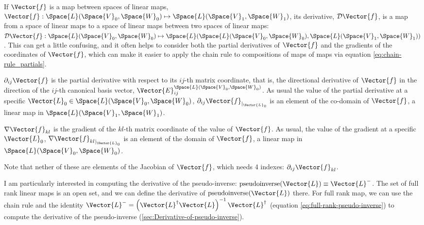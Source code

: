 If $\Vector{f}$ is a map between spaces of linear maps,
$\Vector{f} : \Space{L}(\Space{V}_0,\Space{W}_0) \mapsto \Space{L}(\Space{V}_1,\Space{W}_1)$,
its derivative, $\Da{\Vector{f}}$,
is a map from a space of linear maps
to a space of linear maps between two
spaces of linear maps:
$\Da{\Vector{f}} : \Space{L}(\Space{V}_0,\Space{W}_0) \mapsto
\Space{L}(\Space{L}(\Space{V}_0,\Space{W}_0), \Space{L}(\Space{V}_1,\Space{W}_1))$.
This can get a little confusing,
and it often helps to consider both the partial derivatives of $\Vector{f}$
and the gradients of the coordinates of $\Vector{f}$,
which can make it easier to apply the chain rule to
compositions of maps of maps via equation \ref{eq:chain-rule_partials}.

$\da{ij}{\Vector{f}}$ is the partial derivative with respect to its $ij$-th matrix coordinate,
that is, the directional derivative of $\Vector{f}$ in the direction
of the $ij$-th canonical basis vector, $\Vector{E}_{ij}^{\Space{L}(\Space{V}_0,\Space{W}_0)}$.
As usual the value of the partial derivative at a specific
$\Vector{L}_0 \in  \Space{L}(\Space{V}_0,\Space{W}_0)$,
$\db{ij}{\Vector{f}}{\Vector{L}_0}$ is an element of the co-domain of $\Vector{f}$,
a linear map in  $\Space{L}(\Space{V}_1,\Space{W}_1)$.

$\Ga{\Vector{f}_{kl}}$ is the gradient of the $kl$-th matrix coordinate of the value of $\Vector{f}$.
As usual, the value of the gradient at a specific $\Vector{L}_0$,
$\Gb{\Vector{f}_{kl}}{\Vector{L}_0}$ is an element of the domain of $\Vector{f}$,
a linear map in $\Space{L}(\Space{V}_0,\Space{W}_0)$.

Note that nether of these are elements of the Jacobian of $\Vector{f}$,
which needs 4 indexes: $\da{ij}{\Vector{f}_{kl}}$.

I am particularly interested in computing the derivative of the
pseudo-inverse: $\Pseudoinverse(\Vector{L}) \equiv \Vector{L}^{-}$.
The set of full rank linear maps is an open set,
and we can define the derivative of $\Pseudoinverse(\Vector{L})$ there.
For full rank map,
we can use the chain rule and the identity
$\Vector{L}^{-} = \left( \Vector{L}^{\dagger} \Vector{L} \right)^{-1} \Vector{L}^{\dagger}$
(equation \ref{eq:full-rank-pseudo-inverse})
to compute the derivative of the pseudo-inverse
(\autoref{sec:Derivative-of-pseudo-inverse}).

